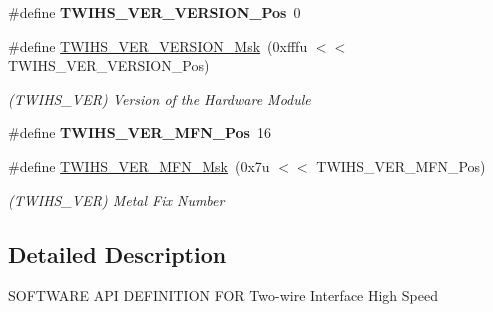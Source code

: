 \begin{DoxyCompactItemize}
\#define {\bfseries T\+W\+I\+H\+S\+\_\+\+V\+E\+R\+\_\+\+V\+E\+R\+S\+I\+O\+N\+\_\+\+Pos}~0
\item 
\mbox{\label{group__SAMV71__TWIHS_gac6757fa983a357e860f4ea2af08874d4}} 
\#define \mbox{\hyperlink{group__SAMV71__TWIHS_gac6757fa983a357e860f4ea2af08874d4}{T\+W\+I\+H\+S\+\_\+\+V\+E\+R\+\_\+\+V\+E\+R\+S\+I\+O\+N\+\_\+\+Msk}}~(0xfffu $<$$<$ T\+W\+I\+H\+S\+\_\+\+V\+E\+R\+\_\+\+V\+E\+R\+S\+I\+O\+N\+\_\+\+Pos)
\begin{DoxyCompactList}\small\item\em (T\+W\+I\+H\+S\+\_\+\+V\+ER) Version of the Hardware Module \end{DoxyCompactList}\item 
\mbox{\label{group__SAMV71__TWIHS_gaabeef921e5dff705537627c5bef1ec9f}} 
\#define {\bfseries T\+W\+I\+H\+S\+\_\+\+V\+E\+R\+\_\+\+M\+F\+N\+\_\+\+Pos}~16
\item 
\mbox{\label{group__SAMV71__TWIHS_ga81ae8dcb7e00c5e655bef4606c508910}} 
\#define \mbox{\hyperlink{group__SAMV71__TWIHS_ga81ae8dcb7e00c5e655bef4606c508910}{T\+W\+I\+H\+S\+\_\+\+V\+E\+R\+\_\+\+M\+F\+N\+\_\+\+Msk}}~(0x7u $<$$<$ T\+W\+I\+H\+S\+\_\+\+V\+E\+R\+\_\+\+M\+F\+N\+\_\+\+Pos)
\begin{DoxyCompactList}\small\item\em (T\+W\+I\+H\+S\+\_\+\+V\+ER) Metal Fix Number \end{DoxyCompactList}\end{DoxyCompactItemize}


\subsection{Detailed Description}
S\+O\+F\+T\+W\+A\+RE A\+PI D\+E\+F\+I\+N\+I\+T\+I\+ON F\+OR Two-\/wire Interface High Speed 